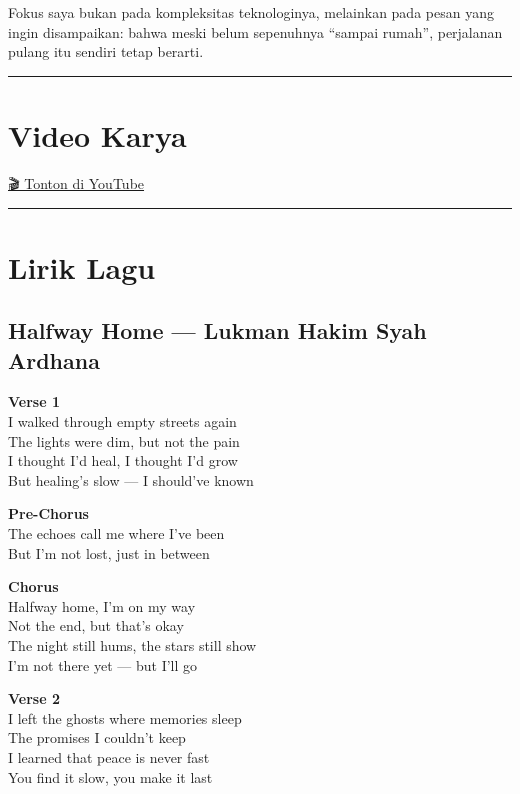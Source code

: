 \documentclass[
  letterpaper,
  DIV=11,
  numbers=noendperiod]{scrreprt}
\begin{document}
Fokus saya bukan pada kompleksitas teknologinya, melainkan pada pesan
yang ingin disampaikan: bahwa meski belum sepenuhnya ``sampai rumah'',
perjalanan pulang itu sendiri tetap berarti.

\begin{center}\rule{0.5\linewidth}{0.5pt}\end{center}

\section{Video Karya}\label{video-karya}

\href{https://youtu.be/qKywgE79b1Q}{🎬 Tonton di YouTube}

\begin{center}\rule{0.5\linewidth}{0.5pt}\end{center}

\section{Lirik Lagu}\label{lirik-lagu}

\subsection{\texorpdfstring{\textbf{Halfway Home --- Lukman Hakim Syah
Ardhana}}{Halfway Home --- Lukman Hakim Syah Ardhana}}\label{halfway-home-lukman-hakim-syah-ardhana}

\textbf{Verse 1}\\
I walked through empty streets again\\
The lights were dim, but not the pain\\
I thought I'd heal, I thought I'd grow\\
But healing's slow --- I should've known

\textbf{Pre-Chorus}\\
The echoes call me where I've been\\
But I'm not lost, just in between

\textbf{Chorus}\\
Halfway home, I'm on my way\\
Not the end, but that's okay\\
The night still hums, the stars still show\\
I'm not there yet --- but I'll go

\textbf{Verse 2}\\
I left the ghosts where memories sleep\\
The promises I couldn't keep\\
I learned that peace is never fast\\
You find it slow, you make it last
\end{document}
